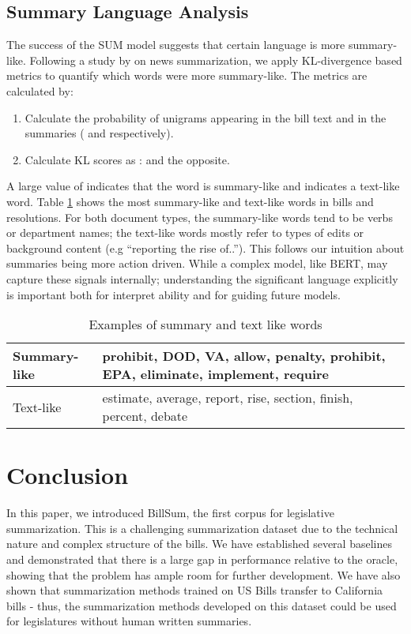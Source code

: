 \documentclass[11pt,a4paper]{article}
\begin{document}
\subsection{Summary Language Analysis}
\label{sec:methods:sum}
The success of the SUM model suggests that certain language is more summary-like. Following a study by \citet{hong2014improving} on news summarization, we apply KL-divergence based metrics to quantify which words were more summary-like. The metrics are calculated by:


\begin{enumerate}

    \item Calculate the probability of unigrams appearing in the bill text and in the summaries ( and  respectively). 
    \item Calculate KL scores as :  and the opposite. 
\end{enumerate}

A large value of  indicates that the word is summary-like and  indicates a text-like word. Table \ref{tab:kl_examples} shows the most summary-like and text-like words in bills and resolutions. For both document types, the summary-like words tend to be verbs or department names; the text-like words mostly refer to types of edits or background content (e.g ``reporting the rise of..''). This follows our intuition about summaries being more action driven. While a complex model, like BERT, may capture these signals internally; understanding the significant language explicitly is important both for interpret ability and for guiding future models.

\begin{table}[h]
\caption{Examples of summary and text like words}
\label{tab:kl_examples}
\begin{tabular}{|l|p{1.72in}|}
\hline
Summary-like & prohibit, DOD, VA, allow, penalty, prohibit, EPA, eliminate, implement, require \\ \hline
Text-like & estimate, average, report, rise, section, finish, percent, debate
 \\ \hline

\end{tabular}
\end{table}

\section{Conclusion}
In this paper, we introduced BillSum, the first corpus for legislative summarization. This is a challenging summarization dataset due to the technical nature and complex structure of the bills. We have established several baselines and demonstrated that there is a large gap in performance relative to the oracle, showing that the problem has ample room for further development. We have also shown that summarization methods trained on US Bills transfer to California bills - thus, the summarization methods developed on this dataset could be used for legislatures without human written summaries.
\end{document}

